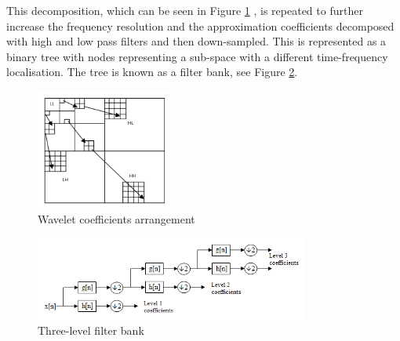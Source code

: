This decomposition, which can be seen in Figure \ref{fig:wavelets_decomposition} \cite{cui2015application}, is repeated to further increase the frequency resolution and the approximation coefficients decomposed with high and low pass filters and then down-sampled. This is represented as a binary tree with nodes representing a sub-space with a different time-frequency localisation. The tree is known as a filter bank, see Figure \ref{fig:wavelets_bank}.


\begin{figure}
	\centering
	\includegraphics[width=0.4\textwidth]{fig/wavelets_decomposition}
	\caption[Wavelet Transform - Coefficients arrangement]{Wavelet coefficients arrangement}
	\label{fig:wavelets_decomposition}
\end{figure}

\begin{figure}
	\centering
	\includegraphics[width=0.8\textwidth]{fig/wavelets_bank}
	\caption[Wavelet Transform - Three-level filter bank]{Three-level filter bank}
	\label{fig:wavelets_bank}
\end{figure}
